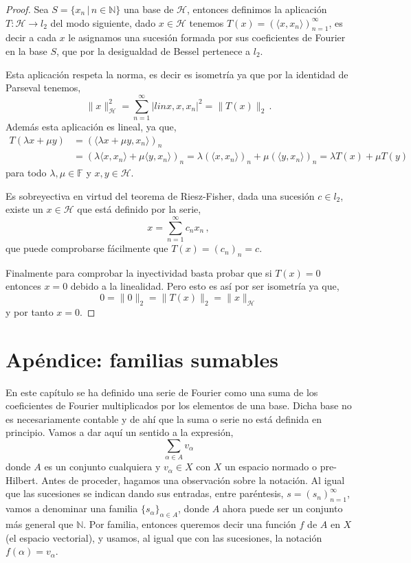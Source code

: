 \documentclass[12pt]{book}
\def\NN{\mathbb{N}}
\def\FF{\mathbb{F}}
\newcommand{\abs}[1]{\lvert #1\rvert }
\newcommand{\norm}[1]{\lVert #1\rVert }
\newcommand{\lin}[1]{\langle #1 \rangle}
\begin{document}
\begin{proof}
Sea $S=\{x_n\,|\,n\in\NN\}$ una base de $\mathcal{H}$, entonces definimos la aplicación $T:\mathcal{H}\longrightarrow l_2$ del modo siguiente, dado $x\in \mathcal{H}$ tenemos $T(x)=(\lin{x,x_n})_{n=1}^\infty$, es decir a cada $x$ le asignamos una sucesión formada por sus coeficientes de Fourier en la base $S$, que   por la desigualdad de Bessel  pertenece a $l_2$.

Esta aplicación respeta la norma, es decir es isometría ya que por la identidad de Parseval tenemos,
$$\norm{x}^2_{\mathcal{H}} = \sum_{n=1}^\infty \abs{lin{x,x,x_n}}^2=\norm{T(x)}_2\,.$$
Además esta aplicación es lineal, ya que,
\begin{align*}
T(\lambda x+\mu y)&=(\lin{\lambda x + \mu y,x_n})_n\\
&=(\lambda\lin{x,x_n}+\mu\lin{y,x_n})_n =\lambda(\lin{x,x_n})_n+\mu(\lin{y,x_n})_n=\lambda T(x) + \mu T(y)
\end{align*}
para todo $\lambda,\mu\in \FF$ y $x,y\in \mathcal{H}$.

 Es sobreyectiva  en virtud del teorema de Riesz-Fisher, dada una sucesión $c\in l_2$,  existe un $x\in \mathcal{H}$ que está definido por la serie,
 $$x=\sum_{n=1}^\infty c_n x_n\,,$$
 que puede comprobarse fácilmente que $T(x)=(c_n)_n =c$.
 
 

Finalmente para comprobar la inyectividad basta probar que si $T(x)=0$ entonces $x=0$  debido a la linealidad. Pero esto es así por ser isometría ya que,
$$0=\norm{0}_2=\norm{T(x)}_2=\norm{x}_{\mathcal{H}}$$
y por tanto $x=0$.
  
\end{proof}

\section{ Apéndice: familias sumables}

En este capítulo se ha definido una serie de Fourier como una suma   de los coeficientes de Fourier multiplicados  por los elementos de una base. Dicha base no es necesariamente contable y de ahí que la suma o serie  no está definida en principio. Vamos a dar aquí un sentido a la expresión,
$$\sum_{\alpha\in A} v_\alpha$$
donde $A$ es un conjunto cualquiera y $v_\alpha\in X$  con $X$ un espacio normado o pre-Hilbert.
Antes de proceder, hagamos una observación sobre la notación. Al igual que las sucesiones  se indican dando sus entradas, entre paréntesis, $s=(s_n)_{n=1}^\infty$, vamos a  denominar una familia  $\{s_\alpha\}_{\alpha\in A}$, donde $A$ ahora puede ser un conjunto más general que $\NN$. Por familia, entonces  queremos decir una función $f$ de $A$ en  $X$ (el espacio vectorial),  y usamos, al igual que con las sucesiones,   la notación  $f(\alpha)=v_\alpha$. 
\end{document}

